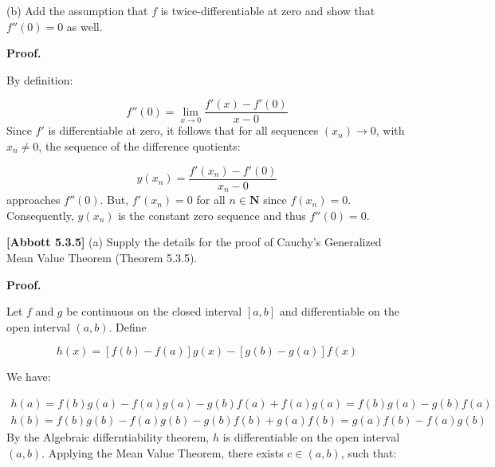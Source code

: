\documentclass[10pt]{article}
\begin{document}
(b) Add the assumption that $\displaystyle f$ is twice-differentiable at zero and show that $\displaystyle f''( 0) =0$ as well.



\textbf{Proof.}



By definition:


\begin{equation*}
f''( 0) =\lim _{x\rightarrow 0}\frac{f'( x) -f'( 0)}{x-0}
\end{equation*}
Since $\displaystyle f'$ is differentiable at zero, it follows that for all sequences $\displaystyle ( x_{n})\rightarrow 0$, with $\displaystyle x_{n} \neq 0$, the sequence of the difference quotients:


\begin{equation*}
y( x_{n}) =\frac{f'( x_{n}) -f'( 0)}{x_{n} -0}
\end{equation*}
approaches $\displaystyle f''( 0)$. But, $\displaystyle f'( x_{n}) =0$ for all $\displaystyle n\in \mathbf{N}$ since $\displaystyle f( x_{n}) =0$. Consequently, $\displaystyle y( x_{n})$ is the constant zero sequence and thus $\displaystyle f''( 0) =0$.



\textbf{[Abbott 5.3.5]} (a) Supply the details for the proof of Cauchy's Generalized Mean Value Theorem (Theorem 5.3.5).



\textbf{Proof.}



Let $\displaystyle f$ and $\displaystyle g$ be continuous on the closed interval $\displaystyle [ a,b]$ and differentiable on the open interval $\displaystyle ( a,b)$. Define 


\begin{equation*}
h( x) =[ f( b) -f( a)] g( x) -[ g( b) -g( a)] f( x)
\end{equation*}


We have:


\begin{gather*}
h( a) =f( b) g( a) -f( a) g( a) -g( b) f( a) +f( a) g( a) =f( b) g( a) -g( b) f( a)\\
h( b) =f( b) g( b) -f( a) g( b) -g( b) f( b) +g( a) f( b) =g( a) f( b) -f( a) g( b)
\end{gather*}
By the Algebraic differntiability theorem, $\displaystyle h$ is differentiable on the open interval $\displaystyle ( a,b)$. Applying the Mean Value Theorem, there exists $\displaystyle c\in ( a,b)$, such that:
\end{document}
